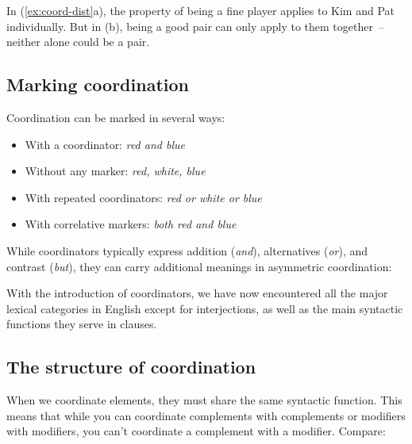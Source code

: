 \ea \label{ex:coord-dist}
    \z
\z

In (\ref{ex:coord-dist}a), the property of being a fine player applies to Kim and Pat individually. But in (b), being a good pair can only apply to them together~-- neither alone could be a pair.

\subsection{Marking coordination}

Coordination can be marked in several ways:
\begin{itemize}[noitemsep]
    \item With a coordinator: \textit{red and blue}
    \item Without any marker: \textit{red, white, blue}
    \item With repeated coordinators: \textit{red or white or blue}
    \item With correlative markers: \textit{both red and blue}
\end{itemize}

While coordinators typically express addition (\textit{and}), alternatives (\textit{or}), and contrast (\textit{but}), they can carry additional meanings in asymmetric coordination:

\ea \label{ex:coord-meaning}
    \z
\z

With the introduction of coordinators, we have now encountered all the major lexical categories in English except for interjections, as well as the main syntactic functions they serve in clauses.

\subsection{The structure of coordination}

When we coordinate elements, they must share the same syntactic function. This means that while you can coordinate complements with complements or modifiers with modifiers, you can't coordinate a complement with a modifier. Compare:

\ea \label{ex:coord-function}
    \z
\z

